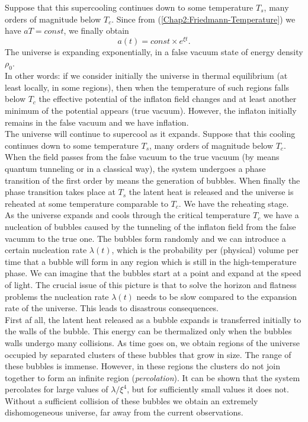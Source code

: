 \documentclass[11pt,a4paper,twoside]{book}
\begin{document}
Suppose that this supercooling continues down to some temperature $ T_{s} $, many orders of magnitude below $ T_{c} $.
Since from (\ref{Chap2:Friedmann-Temperature}) we have $ aT=const $, we finally obtain
\begin{equation}
	\label{Chap2:Expansion}
	a(t)=const \times e^{\xi t}.
\end{equation}
The universe is expanding exponentially, in a false vacuum state of energy density $\rho_{0}$.\\ In other words: if we consider initially the universe in thermal equilibrium (at least locally, in some regions), then when the temperature of such regions falls below $ T_{c} $ the effective potential of the inflaton field changes and at least another minimum  of the potential appears (true vacuum). However, the inflaton initially remains in the false vacuum and we have inflation.\\  
The universe will continue to supercool as it expands. Suppose that this cooling continues down to some temperature $ T_{s} $, many orders of magnitude below $ T_{c} $. When the field passes from the false vacuum to the true vacuum (by means quantum tunneling or in a classical way), the system undergoes a phase transition of the first order by means the generation of bubbles. When finally the phase transition takes place at $ T_{s} $ the latent heat is released and the universe is reheated at some temperature comparable to $ T_{c} $. We have the reheating stage.\\ 
As the universe expands and cools through the critical temperature $ T_{c} $ we have a nucleation of bubbles caused by the tunneling of the inflaton field from the false vacumm to the true one. The bubbles form randomly and we can introduce a certain nucleation rate $ \lambda(t) $, which is the probability per (physical) volume per time that a bubble will form in any region which is still in the high-temperature phase. We can imagine that the bubbles start at a point and expand at the speed of light. 
The crucial issue of this picture is that to solve the horizon and flatness problems the nucleation rate $ \lambda(t) $ needs to be slow compared to the expansion rate of the universe. This leads to disastrous consequences.\\
First af all, the latent heat released as a bubble expands is transferred initially to the walls of the bubble. This energy can be thermalized only when the bubbles walls undergo many collisions. As time goes on, we obtain regions of the universe occupied by separated clusters of these bubbles that grow in size. The range of these bubbles is immense. However, in these regions the clusters do not join together to form an infinite region (\textit{percolation}). It can be shown that the system percolates for large values of $ \lambda/\xi^{4} $, but for sufficiently small values it does not.\\
Without a sufficient collision of these bubbles we obtain an extremely dishomogeneous universe, far away from the current observations.
\end{document}
